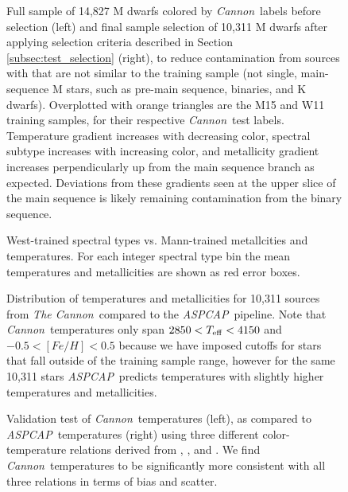 \documentclass[modern]{aastex62}
\newcommand{\thecannon}{\textsl{The Cannon}}
\newcommand{\cannon}{\textsl{Cannon}}
\newcommand{\aspcap}{\textsl{ASPCAP}}
\begin{document}
\begin{figure}[ht]
\caption{Full sample of 14,827 M dwarfs colored by \cannon\ labels before selection (left) and final sample selection of 10,311 M dwarfs after applying selection criteria described in Section \ref{subsec:test_selection} (right), to reduce contamination from sources with that are not similar to the training sample (not single, main-sequence M stars, such as pre-main sequence, binaries, and K dwarfs). Overplotted with orange triangles are the M15 and W11 training samples, for their respective \cannon\ test labels. Temperature gradient increases with decreasing color, spectral subtype increases with increasing color, and metallicity gradient increases perpendicularly up from the main sequence branch as expected. Deviations from these gradients seen at the upper slice of the main sequence is likely remaining contamination from the binary sequence. \label{fig:safe_selection}}
\end{figure}

\begin{figure}[ht]
\caption{West-trained spectral types vs. Mann-trained metallcities and temperatures. For each integer spectral type bin the mean temperatures and metallicities are shown as red error boxes. \label{fig:west_vs_mann}}
\end{figure}

\begin{figure}[ht]
\caption{Distribution of temperatures and metallicities for 10,311 sources from \thecannon\ compared to the \aspcap\ pipeline. Note that \cannon\ temperatures only span $2850<T_{\rm eff}<4150$ and $-0.5<[Fe/H]<0.5$ because we have imposed cutoffs for stars that fall outside of the training sample range, however for the same 10,311 stars \aspcap\ predicts temperatures with slightly higher temperatures and metallicities. \label{fig:aspcap_cannon_label_hist}}
\end{figure}

\begin{figure}[ht]
\caption{Validation test of \cannon\ temperatures (left), as compared to \aspcap\ temperatures (right) using three different color-temperature relations derived from \citealt{Mann:2015}, \citealt{Casagrande:2008}, and \citealt{Boyajian:2013}. We find \cannon\ temperatures to be significantly more consistent with all three relations in terms of bias and scatter. \label{fig:aspcap_cannon_validation}}
\end{figure}
\end{document}
